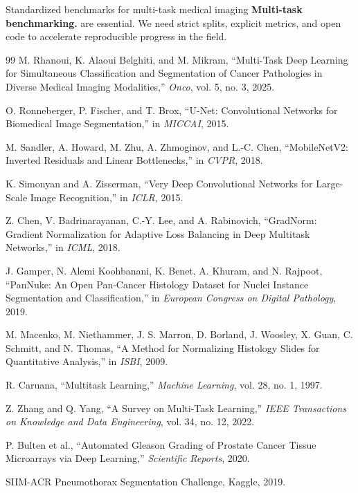 \documentclass[conference,a4paper]{IEEEtran}
\begin{document}
Standardized benchmarks for multi-task medical imaging \textbf{Multi-task benchmarking.} are essential. We need strict splits, explicit metrics, and open code to accelerate reproducible progress in the field.

\begin{thebibliography}{99}
M. Rhanoui, K. Alaoui Belghiti, and M. Mikram, ``Multi-Task Deep Learning for Simultaneous Classification and Segmentation of Cancer Pathologies in Diverse Medical Imaging Modalities,'' \emph{Onco}, vol. 5, no. 3, 2025.

O. Ronneberger, P. Fischer, and T. Brox, ``U-Net: Convolutional Networks for Biomedical Image Segmentation,'' in \emph{MICCAI}, 2015.

M. Sandler, A. Howard, M. Zhu, A. Zhmoginov, and L.-C. Chen, ``MobileNetV2: Inverted Residuals and Linear Bottlenecks,'' in \emph{CVPR}, 2018.

K. Simonyan and A. Zisserman, ``Very Deep Convolutional Networks for Large-Scale Image Recognition,'' in \emph{ICLR}, 2015.

Z. Chen, V. Badrinarayanan, C.-Y. Lee, and A. Rabinovich, ``GradNorm: Gradient Normalization for Adaptive Loss Balancing in Deep Multitask Networks,'' in \emph{ICML}, 2018.

J. Gamper, N. Alemi Koohbanani, K. Benet, A. Khuram, and N. Rajpoot, ``PanNuke: An Open Pan-Cancer Histology Dataset for Nuclei Instance Segmentation and Classification,'' in \emph{European Congress on Digital Pathology}, 2019.

M. Macenko, M. Niethammer, J. S. Marron, D. Borland, J. Woosley, X. Guan, C. Schmitt, and N. Thomas, ``A Method for Normalizing Histology Slides for Quantitative Analysis,'' in \emph{ISBI}, 2009.

R. Caruana, ``Multitask Learning,'' \emph{Machine Learning}, vol. 28, no. 1, 1997.

Z. Zhang and Q. Yang, ``A Survey on Multi-Task Learning,'' \emph{IEEE Transactions on Knowledge and Data Engineering}, vol. 34, no. 12, 2022.

P. Bulten et al., ``Automated Gleason Grading of Prostate Cancer Tissue Microarrays via Deep Learning,'' \emph{Scientific Reports}, 2020.

SIIM-ACR Pneumothorax Segmentation Challenge, Kaggle, 2019.


\end{thebibliography}
\end{document}
